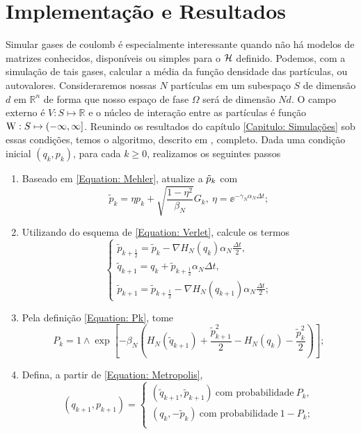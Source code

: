 \chapter{Implementação e Resultados}
\label{Capitulo: Resultados}

 Simular gases de coulomb é especialmente interessante quando não há modelos de matrizes conhecidos, disponíveis ou simples para o $\operatorname{\mathcal{H}}$ definido. Podemos, com a simulação de tais gases, calcular a média da função densidade das partículas, ou autovalores. Consideraremos nossas $N$ partículas em um subespaço $S$ de dimensão $d$ em $\mathbb{R}^n$ de forma que nosso espaço de fase $\Omega$ será de dimensão $Nd$. O campo externo é $V : S \mapsto \mathbb{R}$ e o núcleo de interação entre as partículas é função $\operatorname{W} : S \mapsto (-\infty, \infty]$. Reunindo os resultados do capítulo \ref{Capitulo: Simulações} sob essas condições, temos o algoritmo, descrito em \cite{Chafa2018}, completo. Dada uma condição inicial $(q_k, p_k)$, para cada $k\geq0$, realizamos os seguintes passos
\begin{enumerate}
	\item Baseado em \ref{Equation: Mehler}, atualize a $\tilde{p}_k$ com
	\begin{equation}
	\tilde{p}_k = \eta p_k + \sqrt{\frac{1-\eta^2}{\beta_N}} G_k, \ \eta = \ee^{-\gamma_N \alpha_N \Delta t};
	\label{Equation: Alg Mehler}
	\end{equation}
	\item Utilizando do esquema de \ref{Equation: Verlet}, calcule os termos
	\begin{equation}
	\begin{cases}
		\tilde{p}_{k+\frac{1}{2}} = \tilde{p}_k - \nabla H_N(q_k) \alpha_N \frac{\Delta t}{2}, \\
		\tilde{q}_{k+1} = q_k + \tilde{p}_{k + \frac{1}{2}} \alpha_N \Delta t, \\
		\tilde{p}_{k+1} = \tilde{p}_{k+\frac{1}{2}} - \nabla H_N(q_{k+1}) \alpha_N \frac{\Delta t}{2};
		\label{Equation: Alg Verlet}
	\end{cases}
	\end{equation}
	\item Pela definição \ref{Equation: Pk}, tome
	\begin{equation}
	P_k = 1 \wedge \exp{\left[ -\beta_N \left(  H_N(\tilde{q}_{k+1}) + \frac{\tilde{p}^2_{k+1}}{2} - H_N(q_k) - \frac{\tilde{p}^2_k}{2} \right)\right] };
	\label{Equação: Alg Pk}
	\end{equation}
	\item Defina, a partir de \ref{Equation: Metropolis}, 
	\begin{equation}
	(q_{k+1}, p_{k+1}) = 
	\begin{cases}
		(\tilde{q}_{k+1}, \tilde{p}_{k+1}) \ \text{com probabilidade} \ P_k, \\
		(q_k, -\tilde{p}_{k}) \ \text{com probabilidade} \ 1-P_k; \\
	\end{cases}
	\label{Equation: Alg Metro}
	\end{equation}
\end{enumerate}

